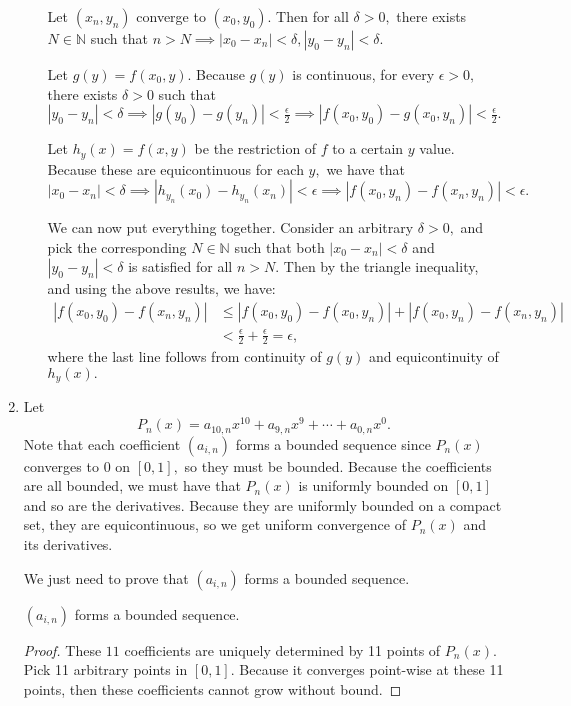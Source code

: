 \documentclass{article}
\numberwithin{equation}{section}
\begin{document}
\begin{enumerate}
\begin{enumerate}[label=(\alph*)]
    Let $(x_n,y_n)$ converge to $(x_0,y_0).$ Then for all $\delta > 0,$ there exists $N\in \mathbb{N}$ such that $n>N\implies |x_0-x_n|<\delta,|y_0-y_n|<\delta.$

    Let $g(y)=f(x_0,y).$ Because $g(y)$ is continuous, for every $\epsilon > 0,$ there exists $\delta > 0$ such that $|y_0-y_n|<\delta \implies |g(y_0)-g(y_n)|<\frac{\epsilon}{2} \implies |f(x_0,y_0) - g(x_0,y_n)| < \frac{\epsilon}{2}.$ 
    
    Let $h_y(x)=f(x,y)$ be the restriction of $f$ to a certain $y$ value. Because these are equicontinuous for each $y,$ we have that $|x_0-x_n| < \delta \implies |h_{y_n}(x_0) - h_{y_n}(x_n)| < \epsilon \implies |f(x_0,y_n) - f(x_n,y_n)| < \epsilon.$ 

    We can now put everything together. Consider an arbitrary $\delta > 0,$ and pick the corresponding $N\in \mathbb{N}$ such that both $|x_0-x_n|<\delta$ and $|y_0-y_n|<\delta$ is satisfied for all $n> N.$ Then by the triangle inequality, and using the above results, we have:
    \begin{align}
        |f(x_0,y_0) - f(x_n,y_n)| & \le |f(x_0,y_0) - f(x_0,y_n)| + |f(x_0,y_n) - f(x_n,y_n)| \\
        & < \frac{\epsilon}{2} + \frac{\epsilon}{2} = \epsilon,
    \end{align}
    where the last line follows from continuity of $g(y)$ and equicontinuity of $h_y(x).$
    \end{enumerate}
    \newpage
    \item Let
    \begin{equation}
        P_n(x) = a_{10,n} x^{10} + a_{9,n} x^9 + \cdots + a_{0,n} x^0.
    \end{equation}
    Note that each coefficient $(a_{i,n})$ forms a bounded sequence since $P_n(x)$ converges to $0$ on $[0,1],$ so they must be bounded. Because the coefficients are all bounded, we must have that $P_n(x)$ is uniformly bounded on $[0,1]$ and so are the derivatives. Because they are uniformly bounded on a compact set, they are equicontinuous, so we get uniform convergence of $P_n(x)$ and its derivatives.

    We just need to prove that $(a_{i,n})$ forms a bounded sequence.
    \begin{lemma}
        $(a_{i,n})$ forms a bounded sequence.
        \begin{proof}
            These $11$ coefficients are uniquely determined by 11 points of $P_n(x).$ Pick 11 arbitrary points in $[0,1].$ Because it converges point-wise at these 11 points, then these coefficients cannot grow without bound.


\end{proof}
\end{lemma}
\end{enumerate}
\end{document}
